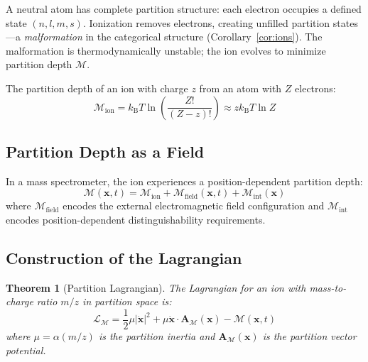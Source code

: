 \documentclass[twocolumn,10pt,a4paper]{article}
\newtheorem{theorem}{Theorem}[section]
\theoremstyle{definition}
\theoremstyle{remark}
\newcommand{\kB}{k_{\mathrm{B}}}
\newcommand{\Depth}{\mathcal{M}}
\newcommand{\Lagr}{\mathcal{L}}
\newcommand{\Apartition}{\mathbf{A}_{\mathcal{M}}}
\newcommand{\partinert}{\mu}
\begin{document}
A neutral atom has complete partition structure: each electron occupies a defined state $(n, l, m, s)$. Ionization removes electrons, creating unfilled partition states---a \emph{malformation} in the categorical structure (Corollary~\ref{cor:ions}). The malformation is thermodynamically unstable; the ion evolves to minimize partition depth $\Depth$.

The partition depth of an ion with charge $z$ from an atom with $Z$ electrons:
\begin{equation}
    \Depth_{\text{ion}} = \kB T \ln\left(\frac{Z!}{(Z-z)!}\right) \approx z\kB T \ln Z
    \label{eq:ion-depth}
\end{equation}

\subsection{Partition Depth as a Field}

In a mass spectrometer, the ion experiences a position-dependent partition depth:
\begin{equation}
    \Depth(\mathbf{x}, t) = \Depth_{\text{ion}} + \Depth_{\text{field}}(\mathbf{x}, t) + \Depth_{\text{int}}(\mathbf{x})
    \label{eq:depth-field}
\end{equation}
where $\Depth_{\text{field}}$ encodes the external electromagnetic field configuration and $\Depth_{\text{int}}$ encodes position-dependent distinguishability requirements.

\subsection{Construction of the Lagrangian}

\begin{theorem}[Partition Lagrangian]
\label{thm:lagrangian}
The Lagrangian for an ion with mass-to-charge ratio $m/z$ in partition space is:
\begin{equation}
    \boxed{\Lagr_{\Depth} = \frac{1}{2}\partinert|\dot{\mathbf{x}}|^2 + \partinert\dot{\mathbf{x}}\cdot\Apartition(\mathbf{x}) - \Depth(\mathbf{x}, t)}
    \label{eq:lagrangian}
\end{equation}
where $\partinert = \alpha(m/z)$ is the partition inertia and $\Apartition(\mathbf{x})$ is the partition vector potential.
\end{theorem}
\end{document}
